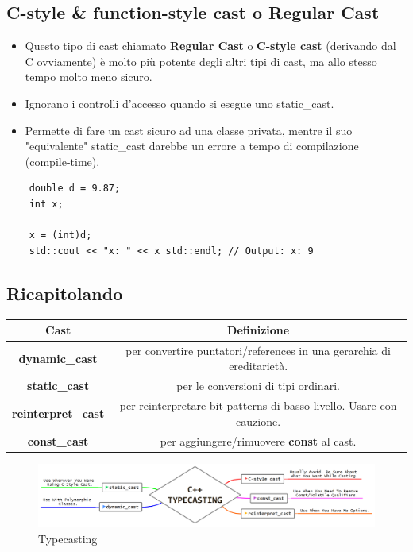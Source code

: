\subsection{C-style \& function-style cast o Regular Cast}

\begin{itemize}
	\item \textsf{\small Questo tipo di cast chiamato \textbf{Regular Cast} o \textbf{C-style cast} (derivando dal C ovviamente) è molto più potente degli altri tipi di cast, ma allo stesso tempo molto meno sicuro.}
	\item \textsf{\small Ignorano i controlli d'accesso quando si esegue uno static\_cast.}
	\item \textsf{\small Permette di fare un cast sicuro ad una classe privata, mentre il suo "equivalente" static\_cast darebbe un errore a tempo di compilazione (compile-time).}
\end{itemize}

\begin{lstlisting}
	double d = 9.87;
	int x;
	
	x = (int)d;
	std::cout << "x: " << x std::endl; // Output: x: 9
\end{lstlisting}

\subsection{Ricapitolando}

\begin{tabular}{|c|c|}
	\hline
	\textbf{Cast} & \textbf{Definizione} \\
	\hline
	\textbf{dynamic\_cast} & \textsf{\small per convertire puntatori/references in una gerarchia di ereditarietà.} \\
	\hline
	\textbf{static\_cast} & \textsf{\small per le conversioni di tipi ordinari.} \\
	\hline
	\textbf{reinterpret\_cast} & \textsf{\small per reinterpretare bit patterns di basso livello. Usare con cauzione.} \\
	\hline
	\textbf{const\_cast} & \textsf{\small per aggiungere/rimuovere \textbf{const} al cast.} \\
	\hline
\end{tabular}

\begin{figure}[ht]
	\centering
	\includegraphics[width=1.2\textwidth, height=1.2\textheight, keepaspectratio]{./imgs/typecasting.png}
	\caption{Typecasting}
	\label{fig:typecasting}
\end{figure}

